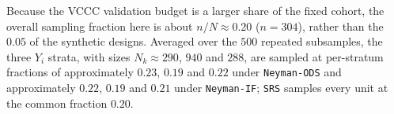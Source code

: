 Because the VCCC validation budget is a larger share of the fixed cohort, the overall sampling fraction here is about $n/N \approx 0.20$ ($n = 304$), rather than the $0.05$ of the synthetic designs. Averaged over the $500$ repeated subsamples, the three $Y_i$ strata, with sizes $N_k \approx 290$, $940$ and $288$, are sampled at per-stratum fractions of approximately $0.23$, $0.19$ and $0.22$ under \texttt{Neyman-ODS} and approximately $0.22$, $0.19$ and $0.21$ under \texttt{Neyman-IF}; \texttt{SRS} samples every unit at the common fraction $0.20$.
